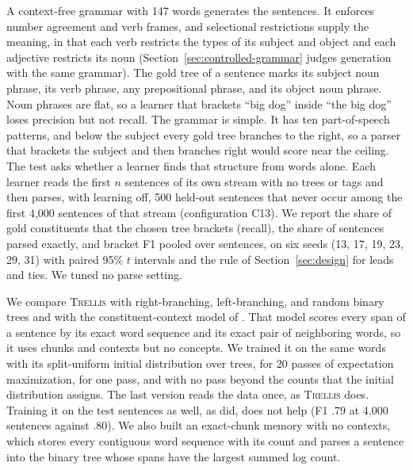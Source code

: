 \documentclass[11pt,letterpaper]{article}
\newcommand{\trellis}{\textsc{Trellis}}
\begin{document}
A context-free grammar with 147 words generates the sentences. It enforces number agreement and verb frames, and selectional restrictions supply the meaning, in that each verb restricts the types of its subject and object and each adjective restricts its noun (Section~\ref{sec:controlled-grammar} judges generation with the same grammar).
The gold tree of a sentence marks its subject noun phrase, its verb phrase, any prepositional phrase, and its object noun phrase. Noun phrases are flat, so a learner that brackets ``big dog'' inside ``the big dog'' loses precision but not recall.
The grammar is simple. It has ten part-of-speech patterns, and below the subject every gold tree branches to the right, so a parser that brackets the subject and then branches right would score near the ceiling. The test asks whether a learner finds that structure from words alone.
Each learner reads the first $n$ sentences of its own stream with no trees or tags and then parses, with learning off, 500 held-out sentences that never occur among the first 4,000 sentences of that stream (configuration C13).
We report the share of gold constituents that the chosen tree brackets (recall), the share of sentences parsed exactly, and bracket F1 pooled over sentences, on six seeds (13, 17, 19, 23, 29, 31) with paired 95\% $t$ intervals and the rule of Section~\ref{sec:design} for leads and ties. We tuned no parse setting.

We compare \trellis{} with right-branching, left-branching, and random binary trees and with the constituent-context model of \citet{klein-manning-ccm}. That model scores every span of a sentence by its exact word sequence and its exact pair of neighboring words, so it uses chunks and contexts but no concepts.
We trained it on the same words with its split-uniform initial distribution over trees, for 20 passes of expectation maximization, for one pass, and with no pass beyond the counts that the initial distribution assigns. The last version reads the data once, as \trellis{} does.
Training it on the test sentences as well, as \citet{klein-manning-ccm} did, does not help (F1 .79 at 4,000 sentences against .80).
We also built an exact-chunk memory with no contexts, which stores every contiguous word sequence with its count and parses a sentence into the binary tree whose spans have the largest summed log count.
\end{document}
